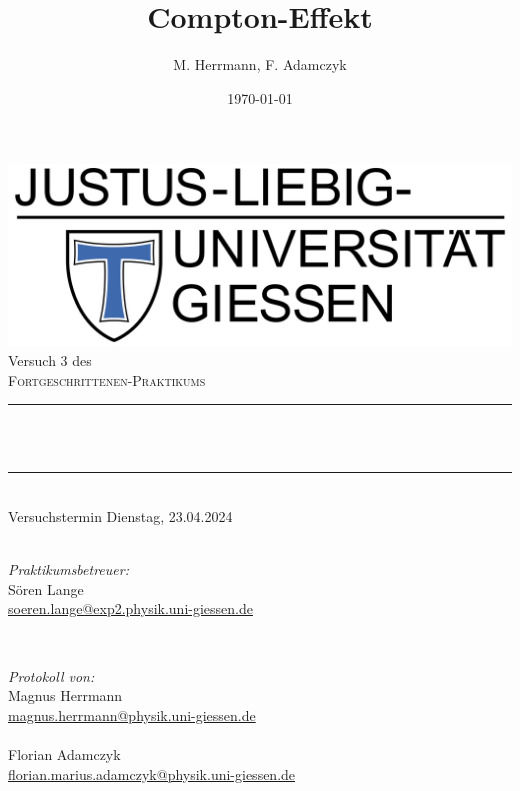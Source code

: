 \documentclass[12pt,a4paper,ngerman]{report}
\title{Compton-Effekt}			%
\author{M. Herrmann, F. Adamczyk}
\date{\today}
\makeatletter
\let\thetitle\@title
\makeatother
\begin{document}

	\begin{titlepage}
		\centering
		\vspace*{0.5 cm}
		\includegraphics[width = 0.6 \textwidth]{JLU_Giessen-Logo}	%
		\\[2.0 cm]
		Versuch 3 des\\
		\textsc{\Large  Fortgeschrittenen-Praktikums}\\ [0.3 cm]				%
		\rule{\linewidth}{0.2 mm} \\[0.4 cm]
		{ \huge \bfseries \thetitle}\\%
		\rule{\linewidth}{0.2 mm}\\
	  Versuchstermin Dienstag, 23.04.2024 \\
		~ \\
		[2.0 cm]


		\begin{minipage}{0.49\textwidth}
			\begin{flushleft}
				\emph{Praktikumsbetreuer:}\\
				Sören Lange\\
				\small{\href{mailto:soeren.lange@exp2.physik.uni-giessen.de}{soeren.lange@exp2.physik.uni-giessen.de}}
			\end{flushleft}
		\end{minipage}~
		\begin{minipage}{0.49\textwidth}
			\begin{flushright}
				\emph{Protokoll von:} \\

				\large{Magnus Herrmann}\\
				\small{\href{mailto:Magnus.Herrmann@physik.uni-giessen.de}{magnus.herrmann@physik.uni-giessen.de}\\~\\
    }
				\large{Florian Adamczyk} \\
				\small{\href{mailto:florian.marius.adamczyk@physik.uni-giessen.de}{florian.marius.adamczyk@physik.uni-giessen.de}\\
      }
			\end{flushright}
		\end{minipage}


\end{titlepage}
\end{document}

